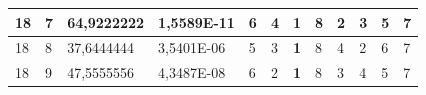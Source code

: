 \documentclass[conference]{IEEEtran}
\begin{document}
\begin{table}[]
\begin{tabular}{|llll|llllllll|}
\multicolumn{1}{|l|}{18}                                                    & \multicolumn{1}{l|}{7}                                                        & \multicolumn{1}{l|}{64,9222222}                                                   & 1,5589E-11                     & \multicolumn{1}{l|}{6}                                                  & \multicolumn{1}{l|}{4}                                                  & \multicolumn{1}{l|}{\textbf{1}}                                         & \multicolumn{1}{l|}{8}                                                  & \multicolumn{1}{l|}{2}                                                  & \multicolumn{1}{l|}{3}                                                  & \multicolumn{1}{l|}{5}                                                  & 7                          \\ \hline
\multicolumn{1}{|l|}{18}                                                    & \multicolumn{1}{l|}{8}                                                        & \multicolumn{1}{l|}{37,6444444}                                                   & 3,5401E-06                     & \multicolumn{1}{l|}{5}                                                  & \multicolumn{1}{l|}{3}                                                  & \multicolumn{1}{l|}{\textbf{1}}                                         & \multicolumn{1}{l|}{8}                                                  & \multicolumn{1}{l|}{4}                                                  & \multicolumn{1}{l|}{2}                                                  & \multicolumn{1}{l|}{6}                                                  & 7                          \\ \hline
\multicolumn{1}{|l|}{18}                                                    & \multicolumn{1}{l|}{9}                                                        & \multicolumn{1}{l|}{47,5555556}                                                   & 4,3487E-08                     & \multicolumn{1}{l|}{6}                                                  & \multicolumn{1}{l|}{2}                                                  & \multicolumn{1}{l|}{\textbf{1}}                                         & \multicolumn{1}{l|}{8}                                                  & \multicolumn{1}{l|}{3}                                                  & \multicolumn{1}{l|}{4}                                                  & \multicolumn{1}{l|}{5}                                                  & 7                          \\ \hline

\end{tabular}
\end{table}
\end{document}
